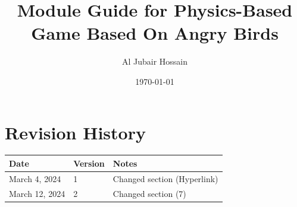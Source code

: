 \documentclass[12pt, titlepage]{article}
\newcommand{\progname}[1]{#1}
\begin{document}
\title{Module Guide for \progname{Physics-Based Game Based On Angry Birds}} 
\author{Al Jubair Hossain}
\date{\today}

\maketitle


\section{Revision History}

\begin{tabularx}{\textwidth}{p{3cm}p{2cm}X}
\toprule {\bf Date} & {\bf Version} & {\bf Notes}\\
\midrule
March 4, 2024 & 1 & Changed section (Hyperlink)\\
March 12, 2024 & 2 & Changed section (7)\\
\bottomrule
\end{tabularx}

\newpage




\end{document}
